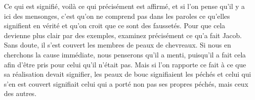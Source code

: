  Ce qui est signifié, voilà ce qui précisément est affirmé, et si l’on pense qu’il y a ici des mensonges, c'est qu’on ne comprend pas dans les paroles ce qu’elles signifient en vérité et qu’on croit que ce sont des faussetés. Pour que cela devienne plus clair par des exemples, examinez précisément ce qu’a fait Jacob. Sans doute, il s’est couvert les membres de peaux de chevreaux. Si nous en cherchons la cause immédiate, nous penserons qu’il a menti, puisqu’il a fait cela afin d’être pris pour celui qu’il n’était pas. Mais si l’on rapporte ce fait à ce que sa réalisation devait signifier, les peaux de bouc signifiaient les péchés et celui qui s’en est couvert signifiait celui qui a porté non pas ses propres péchés, mais ceux des autres.